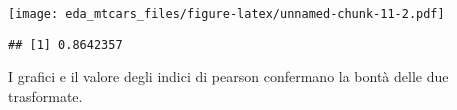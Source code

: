 \documentclass[
]{article}
\newenvironment{Shaded}{\begin{snugshade}}{\end{snugshade}}
\newcommand{\AttributeTok}[1]{\textcolor[rgb]{0.77,0.63,0.00}{#1}}
\newcommand{\DecValTok}[1]{\textcolor[rgb]{0.00,0.00,0.81}{#1}}
\newcommand{\FunctionTok}[1]{\textcolor[rgb]{0.00,0.00,0.00}{#1}}
\newcommand{\NormalTok}[1]{#1}
\newcommand{\SpecialCharTok}[1]{\textcolor[rgb]{0.00,0.00,0.00}{#1}}
\newcommand{\StringTok}[1]{\textcolor[rgb]{0.31,0.60,0.02}{#1}}
\begin{document}
\texttt{[image: eda\_mtcars\_files/figure-latex/unnamed-chunk-11-2.pdf]}

\begin{Shaded}
\end{Shaded}

\begin{verbatim}
## [1] 0.8642357
\end{verbatim}

I grafici e il valore degli indici di pearson confermano la bontà delle
due trasformate.
\end{document}
